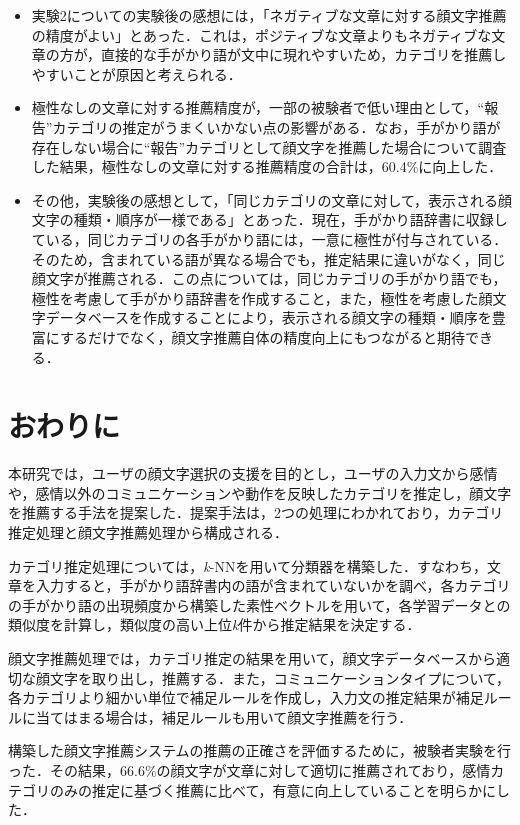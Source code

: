 \documentclass[japanese]{jnlp_1.4}
\begin{document}
\begin{itemize}
\item 実験2についての実験後の感想には，「ネガティブな文章に対する顔文字推薦の精度がよい」とあった．これは，ポジティブな文章よりもネガティブな文章の方が，直接的な手がかり語が文中に現れやすいため，カテゴリを推薦しやすいことが原因と考えられる．
\item 極性なしの文章に対する推薦精度が，一部の被験者で低い理由として，``報告''カテゴリの推定がうまくいかない点の影響がある．なお，手がかり語が存在しない場合に``報告''カテゴリとして顔文字を推薦した場合について調査した結果，極性なしの文章に対する推薦精度の合計は，60.4\%に向上した．
\item その他，実験後の感想として，「同じカテゴリの文章に対して，表示される顔文字の種類・順序が一様である」とあった．現在，手がかり語辞書に収録している，同じカテゴリの各手がかり語には，一意に極性が付与されている．そのため，含まれている語が異なる場合でも，推定結果に違いがなく，同じ顔文字が推薦される．この点については，同じカテゴリの手がかり語でも，極性を考慮して手がかり語辞書を作成すること，また，極性を考慮した顔文字データベースを作成することにより，表示される顔文字の種類・順序を豊富にするだけでなく，顔文字推薦自体の精度向上にもつながると期待できる．
\end{itemize}


\section{おわりに}
\label{sec:conclusion}

本研究では，ユーザの顔文字選択の支援を目的とし，ユーザの入力文から感情や，感情以外のコミュニケーションや動作を反映したカテゴリを推定し，顔文字を推薦する手法を提案した．提案手法は，2つの処理にわかれており，カテゴリ推定処理と顔文字推薦処理から構成される．

カテゴリ推定処理については，{\it k}-NNを用いて分類器を構築した．すなわち，文章を入力すると，手がかり語辞書内の語が含まれていないかを調べ，各カテゴリの手がかり語の出現頻度から構築した素性ベクトルを用いて，各学習データとの類似度を計算し，類似度の高い上位{\it k}件から推定結果を決定する．

顔文字推薦処理では，カテゴリ推定の結果を用いて，顔文字データベースから適切な顔文字を取り出し，推薦する．また，コミュニケーションタイプについて，各カテゴリより細かい単位で補足ルールを作成し，入力文の推定結果が補足ルールに当てはまる場合は，補足ルールも用いて顔文字推薦を行う．

構築した顔文字推薦システムの推薦の正確さを評価するために，被験者実験を行った．その結果，66.6\%の顔文字が文章に対して適切に推薦されており，感情カテゴリのみの推定に基づく推薦に比べて，有意に向上していることを明らかにした．
\end{document}
